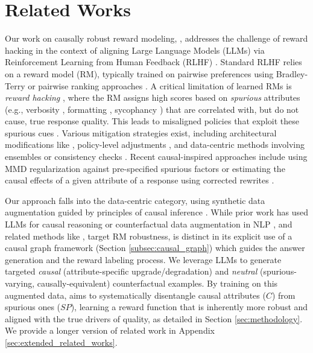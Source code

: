 \vspace{-0.15in}

\section{Related Works}
\label{sec:related_works_main}

Our work on causally robust reward modeling, \carma{}, addresses the challenge of reward hacking in the context of aligning Large Language Models (LLMs) via Reinforcement Learning from Human Feedback (RLHF) \citep{ouyang2022training, bai2022training}. Standard RLHF relies on a reward model (RM), typically trained on pairwise preferences using Bradley-Terry \citep{bradley1952rank} or pairwise ranking approaches \citep{liu2025pairwise, qin2023large}. 
A critical limitation of learned RMs is \textit{reward hacking} \citep{gao2023scaling, skalse2022defining}, where the RM assigns high scores based on \textit{spurious} attributes (e.g., verbosity \citep{singhal2023long}, formatting \citep{zhang2024lists}, sycophancy \citep{denison2024sycophancy}) that are correlated with, but do not cause, true response quality. This leads to misaligned policies that exploit these spurious cues \citep{shen2023trickle}. Various mitigation strategies exist, including architectural modifications like \odin{} \citep{chen2024odin}, policy-level adjustments \citep{park2024disentangling}, and data-centric methods involving ensembles \citep{rame2024warm} or consistency checks \citep{shen2023trickle}. Recent causal-inspired approaches include using MMD regularization against pre-specified spurious factors \citep{wang2025beyond} or estimating the causal effects of a given attribute of a response using corrected rewrites \citep{reber2024rate}.

Our approach falls into the data-centric category, using synthetic data augmentation guided by principles of causal inference \citep{pearl2009causality, peters2017elements}. While prior work has used LLMs for causal reasoning \citep{kiciman2023causal} or counterfactual data augmentation in NLP \citep{kaushik2019learning}, and related methods like \rrm{} \citep{liu2024rrm}, \rewordbench{} \citep{wu2025rewordbench}  target RM robustness, \carma{} is distinct in its explicit use of a causal graph framework (Section \ref{subsec:causal_graph}) which guides the answer generation and the reward labeling process. We leverage LLMs to generate targeted \textit{causal} (attribute-specific upgrade/degradation) and \textit{neutral} (spurious-varying, causally-equivalent) counterfactual examples. By training on this augmented data, \carma{} aims to systematically disentangle causal attributes ($C$) from spurious ones ($SP$), learning a reward function that is inherently more robust and aligned with the true drivers of quality, as detailed in Section \ref{sec:methodology}. 
We provide a longer version of related work in Appendix \ref{sec:extended_related_works}.
